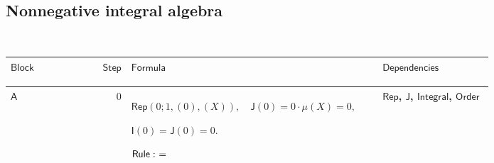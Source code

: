 \documentclass[12pt,reqno]{amsart}
\theoremstyle{blueplain}
\numberwithin{equation}{section}
\newlength{\DCTOneColumnBody}
\begin{document}
{\scriptsize \ }

\subsection{\protect\scriptsize Nonnegative integral algebra}

{\scriptsize {\ }}

{\scriptsize \setlength{\parskip}{0pt}\nointerlineskip
\noindent 
\begin{tabular}{|@{}>{\centering\arraybackslash}m{\DCTOneColumnBody}|}
\hline
$\displaystyle \mathsf{NonnegativeIntegralAlgebra}$ \\ \hline
\end{tabular}%
}

{\scriptsize \setlength{\parskip}{0pt}\nointerlineskip
\noindent 
\begin{tabular}{|@{}>{\centering\arraybackslash}m{0.10658\linewidth}|>{\centering\arraybackslash}m{0.03553\linewidth}|>{\centering\arraybackslash}m{0.52105\linewidth}|>{\centering\arraybackslash}m{0.23684\linewidth}|}
\hline
$\displaystyle \mathsf{Block}$ & $\displaystyle \mathsf{Step}$ & $%
\displaystyle \mathsf{Formula}$ & $\displaystyle \mathsf{Dependencies}$ \\ 
\hline
\end{tabular}%
}

{\scriptsize \setlength{\parskip}{0pt}\nointerlineskip
\noindent 
\begin{tabular}{|@{}>{\centering\arraybackslash}m{\DCTOneColumnBody}|}
\hline
$\displaystyle \mathsf{Context\_A}:=$\par$\displaystyle h,v:\mathsf{F},\quad%
\mathsf{Measurable}(h)\land\mathsf{Measurable}(v).$ \\ \hline
\end{tabular}%
}

{\scriptsize \setlength{\parskip}{0pt}\nointerlineskip
\noindent 
\begin{tabular}{|@{}>{\centering\arraybackslash}m{0.10658\linewidth}|>{\centering\arraybackslash}m{0.03553\linewidth}|>{\centering\arraybackslash}m{0.52105\linewidth}|>{\centering\arraybackslash}m{0.23684\linewidth}|}
\hline
\hypertarget{dct:A0}{$\displaystyle \mathsf{A}$} & $\displaystyle 0$ & $%
\displaystyle \mathsf{Rep}(0;1,(0),(X)),\quad\mathsf{J}(0)=0\cdot\mu(X)=0,$%
\par$\displaystyle \mathsf{I}(0)=\mathsf{J}(0)=0.$\par$\displaystyle \mathsf{%
Rule}:\ =$ & \hyperlink{def:Rep}{$\displaystyle \mathsf{Rep}$}, \hyperlink{def:J}%
{$\displaystyle \mathsf{J}$}, \hyperlink{lem:Integral}{$\displaystyle 
\mathsf{Integral}$}, \hyperlink{ax:Order}{$\displaystyle \mathsf{Order}$} \\ 
\hline
\end{tabular}%
}
\end{document}
